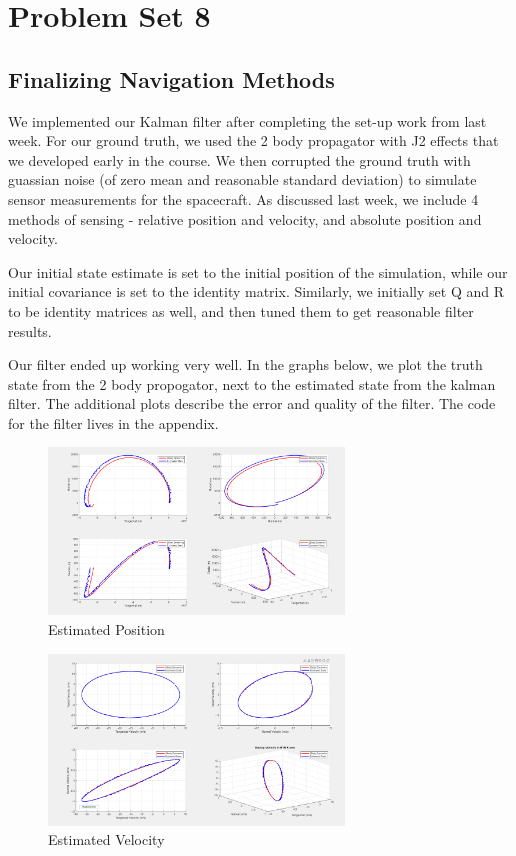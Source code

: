 \section{Problem Set 8}

\subsection{Finalizing Navigation Methods}

We implemented our Kalman filter after completing the set-up work from last week. For our ground truth, we used the 2 body propagator with J2 effects that we developed early in the course. We then corrupted the ground truth with guassian noise (of zero mean and reasonable standard deviation) to simulate sensor measurements for the spacecraft. As discussed last week, we include 4 methods of sensing - relative position and velocity, and absolute position and velocity.

Our initial state estimate is set to the initial position of the simulation, while our initial covariance is set to the identity matrix. Similarly, we initially set Q and R to be identity matrices as well, and then tuned them to get reasonable filter results.

Our filter ended up working very well. In the graphs below, we plot the truth state from the 2 body propogator, next to the estimated state from the kalman filter. The additional plots describe the error and quality of the filter. The code for the filter lives in the appendix.

\begin{figure}[H]
    \centering
    \includegraphics[width=0.7\textwidth]{PS8/Figures/position.png}
    \caption{Estimated Position}
    \label{fig:hcw_velocity}
\end{figure}

\begin{figure}[H]
    \centering
    \includegraphics[width=0.7\textwidth]{PS8/Figures/velocity.png}
    \caption{Estimated Velocity}
    \label{fig:hcw_velocity}
\end{figure}

